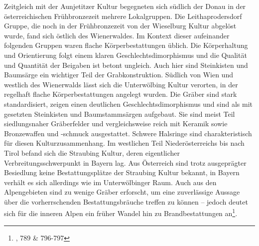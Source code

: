 \documentclass[openany,twoside,twocolumn]{book}
\let\rmarkdownfootnote\footnote%
\def\footnote{\protect\rmarkdownfootnote}
\begin{document}
Zeitgleich mit der Aunjetitzer Kultur begegneten sich südlich der Donau in der österreichischen Frühbronzezeit mehrere Lokalgruppen. Die Leithaprodersdorf Gruppe, die noch in der Frühbronzezeit von der Wieselburg Kultur abgelöst wurde, fand sich östlich des Wienerwaldes. Im Kontext dieser aufeinander folgenden Gruppen waren flache Körperbestattungen üblich. Die Körperhaltung und Orientierung folgt einem klaren Geschlechtsdimorphismus und die Qualität und Quantität der Beigaben ist betont ungleich. Auch hier sind Steinkisten und Baumsärge ein wichtiger Teil der Grabkonstruktion. Südlich von Wien und westlich des Wienerwalds lässt sich die Unterwölbing Kultur verorten, in der regelhaft flache Körperbestattungen angelegt wurden. Die Gräber sind stark standardisiert, zeigen einen deutlichen Geschlechtsdimorphismus und sind als mit gesetzten Steinkisten und Baumstammsärgen aufgebaut. Sie sind meist Teil siedlungsnaher Gräberfelder und vergleichsweise reich mit Keramik sowie Bronzewaffen und -schmuck ausgestattet. Schwere Halsringe sind charakteristisch für diesen Kulturzusammenhang. Im westlichen Teil Niederösterreichs bis nach Tirol befand sich die Straubing Kultur, deren eigentlicher Verbreitungsschwerpunkt in Bayern lag. Aus Österreich sind trotz ausgeprägter Besiedlung keine Bestattungsplätze der Straubing Kultur bekannt, in Bayern verhält es sich allerdings wie im Unterwölbinger Raum. Auch aus den Alpengebieten sind zu wenige Gräber erforscht, um eine zuverlässige Aussage über die vorherrschenden Bestattungsbräuche treffen zu können -- jedoch deutet sich für die inneren Alpen ein früher Wandel hin zu Brandbestattungen an\footnote{\textcite{lubos_czech_2013}, 789 \& 796-797}.
\end{document}
